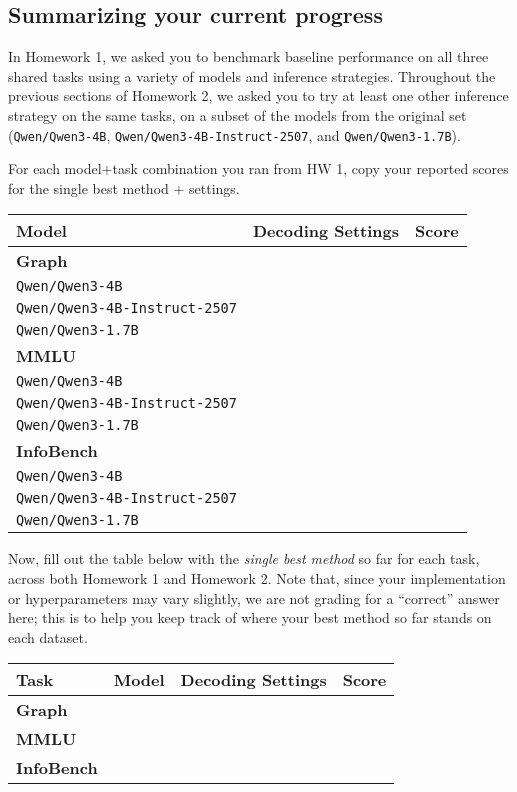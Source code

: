 \documentclass{article}
\begin{document}
\subsection{Summarizing your current progress}
In Homework 1, we asked you to benchmark baseline performance on all three shared tasks using a variety of models and inference strategies. Throughout the previous sections of Homework 2, we asked you to try at least one other inference strategy on the same tasks, on a subset of the models from the original set (\texttt{Qwen/Qwen3-4B}, \texttt{Qwen/Qwen3-4B-Instruct-2507}, and \texttt{Qwen/Qwen3-1.7B}).

For each model+task combination you ran from HW 1, copy your reported scores for the single best method + settings. 


\begin{solve}
    \begin{tabular}{lcc}
\toprule
Model & Decoding Settings & Score \\
\midrule
\multicolumn{3}{l}{\textbf{Graph}} \\
\midrule
\texttt{Qwen/Qwen3-4B} & & \\
\texttt{Qwen/Qwen3-4B-Instruct-2507} & & \\ 
\texttt{Qwen/Qwen3-1.7B} & & \\
\midrule
\multicolumn{3}{l}{\textbf{MMLU}} \\
\midrule
\texttt{Qwen/Qwen3-4B} & & \\
\texttt{Qwen/Qwen3-4B-Instruct-2507} & & \\ 
\texttt{Qwen/Qwen3-1.7B} & & \\
\midrule
\multicolumn{3}{l}{\textbf{InfoBench}} \\
\midrule
\texttt{Qwen/Qwen3-4B} & & \\
\texttt{Qwen/Qwen3-4B-Instruct-2507} & & \\ 
\texttt{Qwen/Qwen3-1.7B} & & \\
\bottomrule
\end{tabular}
\end{solve}

Now, fill out the table below with the \textit{single best method} so far for each task, across both Homework 1 and Homework 2. Note that, since your implementation or hyperparameters may vary slightly, we are not grading for a ``correct'' answer here; this is to help you keep track of where your best method so far stands on each dataset.
\begin{solve}
    \begin{tabular}{llcc}
\toprule
Task & Model & Decoding Settings & Score \\
\midrule
\textbf{Graph} & & & \\
\midrule
\textbf{MMLU} & & & \\ 
\midrule
\textbf{InfoBench} & & & \\ 
\bottomrule
\end{tabular}
\end{solve}
\end{document}
